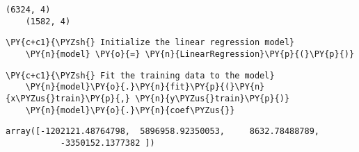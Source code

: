         \begin{Verbatim}[commandchars=\\\{\}]
    (6324, 4)
    (1582, 4)
        \end{Verbatim}
    
        \begin{tcolorbox}[breakable, size=fbox, boxrule=1pt, pad at break*=1mm,colback=cellbackground, colframe=cellborder]
    \begin{Verbatim}[commandchars=\\\{\}]
    \PY{c+c1}{\PYZsh{} Initialize the linear regression model}
    \PY{n}{model} \PY{o}{=} \PY{n}{LinearRegression}\PY{p}{(}\PY{p}{)}
    \end{Verbatim}
    \end{tcolorbox}
    
        \begin{tcolorbox}[breakable, size=fbox, boxrule=1pt, pad at break*=1mm,colback=cellbackground, colframe=cellborder]
    \begin{Verbatim}[commandchars=\\\{\}]
    \PY{c+c1}{\PYZsh{} Fit the training data to the model}
    \PY{n}{model}\PY{o}{.}\PY{n}{fit}\PY{p}{(}\PY{n}{x\PYZus{}train}\PY{p}{,} \PY{n}{y\PYZus{}train}\PY{p}{)}
    \PY{n}{model}\PY{o}{.}\PY{n}{coef\PYZus{}}
    \end{Verbatim}
    \end{tcolorbox}
    
                \begin{tcolorbox}[breakable, size=fbox, boxrule=.5pt, pad at break*=1mm, opacityfill=0]
    \begin{Verbatim}[commandchars=\\\{\}]
    array([-1202121.48764798,  5896958.92350053,     8632.78488789,
           -3350152.1377382 ])
    \end{Verbatim}
    \end{tcolorbox}
            
